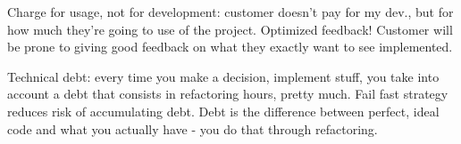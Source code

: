 \noindent Charge for usage, not for development: customer doesn't pay for my dev., but for how much they're going to use of the project. Optimized feedback! Customer will be prone to giving good feedback on what they exactly want to see implemented.

\noindent Technical debt: every time you make a decision, implement stuff, you take into account a debt that consists in refactoring hours, pretty much. Fail fast strategy reduces risk of accumulating debt. Debt is the difference between perfect, ideal code and what you actually have - you do that through refactoring.

